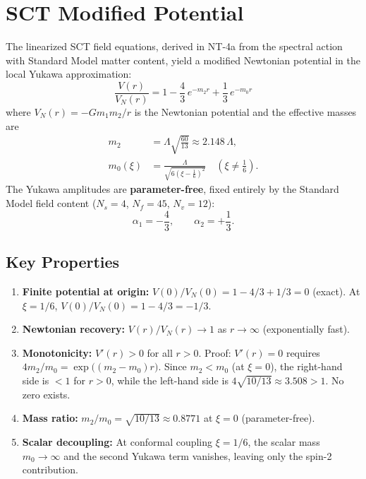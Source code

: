\documentclass[11pt,a4paper]{article}
\begin{document}
\section{SCT Modified Potential}
\label{sec:potential}

The linearized SCT field equations, derived in NT-4a from the spectral action
with Standard Model matter content, yield a modified Newtonian potential in the
local Yukawa approximation:
\begin{equation}
  \boxed{
    \frac{V(r)}{V_N(r)} = 1 - \frac{4}{3}\,e^{-m_2 r}
    + \frac{1}{3}\,e^{-m_0 r}
  }
  \label{eq:potential}
\end{equation}
where $V_N(r) = -Gm_1 m_2/r$ is the Newtonian potential and the effective
masses are
\begin{align}
  m_2 &= \Lambda\sqrt{\frac{60}{13}} \approx 2.148\,\Lambda, \label{eq:m2}\\[4pt]
  m_0(\xi) &= \frac{\Lambda}{\sqrt{6\!\left(\xi - \tfrac{1}{6}\right)^{\!2}}}
  \quad (\xi \neq \tfrac{1}{6}). \label{eq:m0}
\end{align}
The Yukawa amplitudes are \textbf{parameter-free}, fixed entirely by the
Standard Model field content ($N_s = 4$, $N_f = 45$, $N_v = 12$):
\begin{equation}
  \alpha_1 = -\frac{4}{3}, \qquad
  \alpha_2 = +\frac{1}{3}.
  \label{eq:alphas}
\end{equation}

\subsection{Key Properties}

\begin{enumerate}[label=(\alph*)]
  \item \textbf{Finite potential at origin:}
    $V(0)/V_N(0) = 1 - 4/3 + 1/3 = 0$ (exact).
    At $\xi = 1/6$, $V(0)/V_N(0) = 1 - 4/3 = -1/3$.

  \item \textbf{Newtonian recovery:}
    $V(r)/V_N(r) \to 1$ as $r \to \infty$ (exponentially fast).

  \item \textbf{Monotonicity:}
    $V'(r) > 0$ for all $r > 0$. Proof: $V'(r) = 0$ requires
    $4 m_2/m_0 = \exp\!\bigl((m_2 - m_0)r\bigr)$. Since $m_2 < m_0$ (at
    $\xi = 0$), the right-hand side is $< 1$ for $r > 0$, while the
    left-hand side is $4\sqrt{10/13} \approx 3.508 > 1$. No zero exists.

  \item \textbf{Mass ratio:}
    $m_2/m_0 = \sqrt{10/13} \approx 0.8771$ at $\xi = 0$ (parameter-free).

  \item \textbf{Scalar decoupling:}
    At conformal coupling $\xi = 1/6$, the scalar mass $m_0 \to \infty$ and the
    second Yukawa term vanishes, leaving only the spin-2 contribution.
\end{enumerate}
\end{document}

